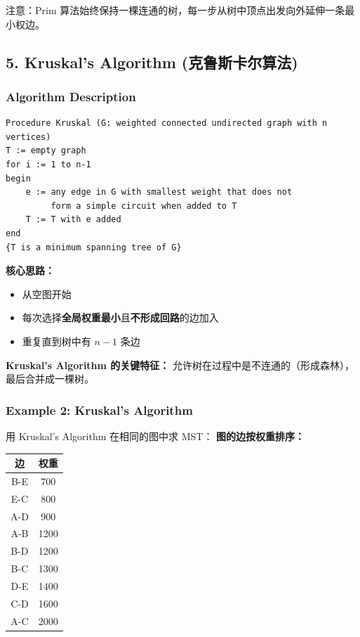 \documentclass[10pt,a4paper,openany]{ctexbook}
\theoremstyle{definition}
\theoremstyle{remark}
\renewenvironment{quote}
  {\list{}{\leftmargin=1em\rightmargin=0pt\topsep=0.5pt\partopsep=0pt}\item[]}
  {\endlist}
\begin{document}
\begin{quote}
注意：Prim 算法始终保持一棵连通的树，每一步从树中顶点出发向外延伸一条最小权边。

\end{quote}
\vspace{-2pt}

\subsection{5. Kruskal's Algorithm (克鲁斯卡尔算法)}

\subsubsection{Algorithm Description}

{\footnotesize\begin{verbatim}
Procedure Kruskal (G: weighted connected undirected graph with n vertices)
T := empty graph
for i := 1 to n-1
begin
    e := any edge in G with smallest weight that does not
         form a simple circuit when added to T
    T := T with e added
end
{T is a minimum spanning tree of G}
\end{verbatim}}

\textbf{核心思路：}
\begin{itemize}
\item 从空图开始
\item 每次选择\textbf{全局权重最小}且\textbf{不形成回路}的边加入
\item 重复直到树中有 $n-1$ 条边

\end{itemize}

\begin{quote}
\textbf{Kruskal's Algorithm 的关键特征：} 允许树在过程中是不连通的（形成森林），最后合并成一棵树。

\end{quote}

\subsubsection{Example 2: Kruskal's Algorithm}

用 Kruskal's Algorithm 在相同的图中求 MST：
\textbf{图的边按权重排序：}
\begin{center}
\begin{tabular}{cc}
\hline
边 & 权重 \\ \hline
B-E & 700 \\
E-C & 800 \\
A-D & 900 \\
A-B & 1200 \\
B-D & 1200 \\
B-C & 1300 \\
D-E & 1400 \\
C-D & 1600 \\
A-C & 2000 \\
\hline
\end{tabular}

\end{center}
\end{document}
